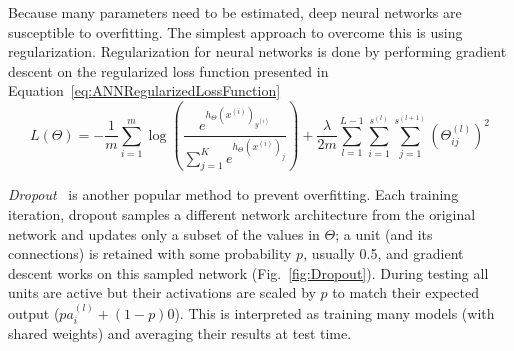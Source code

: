 Because many parameters need to be estimated, deep neural networks are susceptible to overfitting. The simplest approach to overcome this is using regularization. Regularization for neural networks is done by performing gradient descent on the regularized loss function presented in Equation~\ref{eq:ANNRegularizedLossFunction}
\begin{equation}
	L(\Theta) = -\frac{1}{m} \sum_{i=1}^m \log \left ( \frac{ e^{h_\Theta(x^{(i)})_{y^{(i)}}} }{ \sum_{j=1}^K e^{ h_\Theta (x^{(i)})_j} } \right ) + \frac{\lambda}{2m}\sum_{l=1}^{L-1}\sum_{i=1}^{s^{(l)}}\sum_{j=1}^{s^{(l+1)}} \left(\Theta^{(l)}_{ij}\right)^2
	\label{eq:ANNRegularizedLossFunction}
\end{equation}

\emph{Dropout}~\cite{Srivastava2014} is another popular method to prevent overfitting. Each training iteration, dropout samples a different network architecture from the original network and updates only a subset of the values in $\Theta$; a unit (and its connections) is retained with some probability $p$, usually 0.5, and gradient descent works on this sampled network (Fig.~\ref{fig:Dropout}). During testing all units are active but their activations are scaled by $p$ to match their expected output ($p a^{(l)}_i + (1-p) 0$). This is interpreted as training many models (with shared weights) and averaging their results at test time.

